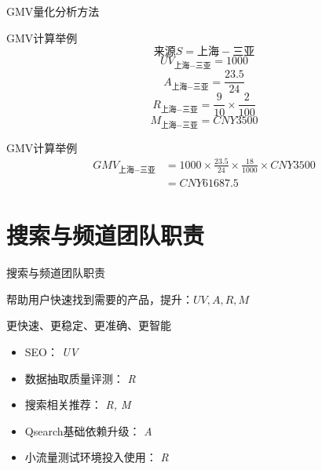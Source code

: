 \documentclass{beamer}
\begin{document}
\begin{CJK}{UTF8}{gbsn}
\begin{frame}{GMV量化分析方法}
\end{frame}

\begin{frame}{GMV计算举例}
  $$  \text{来源}S = \text{上海}-\text{三亚} $$
   {
    $$  UV_{\text{上海}-\text{三亚}} = 1000 $$
  }
   {
    $$  A_{\text{上海}-\text{三亚}} = \frac{23.5}{24} $$
  }
   {
    $$  R_{\text{上海}-\text{三亚}} = \frac{9}{10} \times \frac{2}{100} $$
  }
   {
    $$  M_{\text{上海}-\text{三亚}} = CNY 3500 $$
  }
\end{frame}

\begin{frame}{GMV计算举例}
    $$
    \begin{aligned}
      GMV_{\text{上海}-\text{三亚}} &= 1000 \times \frac{23.5}{24} \times \frac{18}{1000} \times CNY 3500 \\
      &= CNY 61687.5
    \end{aligned}
    $$
\end{frame}

\section{搜索与频道团队职责}

\begin{frame}{搜索与频道团队职责}

帮助用户快速找到需要的产品，提升：$ UV, A, R, M $

更快速、更稳定、更准确、更智能

 {
  \begin{itemize}
    \item SEO： {\itshape UV}
    \item 数据抽取质量评测： {\itshape R}
    \item 搜索相关推荐： {\itshape R, M}
    \item Qsearch基础依赖升级： {\itshape A}
    \item 小流量测试环境投入使用： {\itshape R}
  \end{itemize}
}

\end{frame}



\end{CJK}
\end{document}
